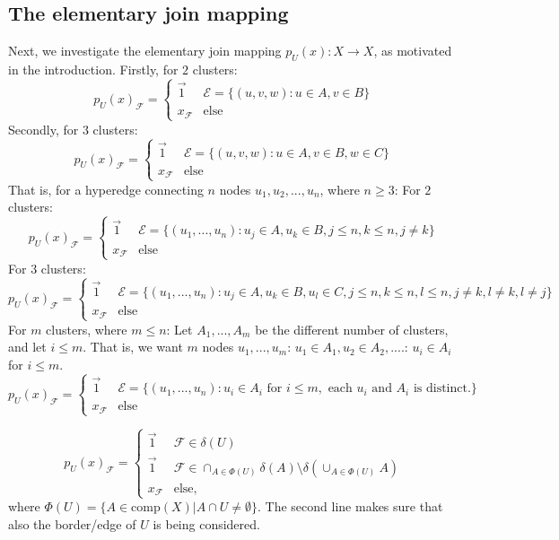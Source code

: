\subsection{The elementary join mapping}
Next, we investigate the elementary join mapping $p_U(x): X \to X$, as motivated in the introduction. Firstly, for $2$ clusters: \[ p_U(x)_{\mathcal{F}}=\begin{cases}
\vec{1} & \mathcal{E}=\{ (u,v,w): u \in A, v \in B\} \\
x_{\mathcal{F}} &  \text{else} 
\end{cases} \] 
Secondly, for $3$ clusters: \[ p_U(x)_{\mathcal{F}}=\begin{cases}
\vec{1} & \mathcal{E}=\{ (u,v,w): u \in A, v \in B, w \in C\} \\
x_{\mathcal{F}}  &  \text{else} 
\end{cases} \] 
That is, for a hyperedge connecting $n$ nodes $u_1,u_2, ..., u_n$, where $n \geq 3$: For $2$ clusters: 
\[ p_U(x)_{\mathcal{F}}=\begin{cases} \vec{1} & \mathcal{E}=\{ (u_1,..., u_n): u_j \in A, u_k \in B, j \leq n, k \leq n, j \neq k \} \\
x_{\mathcal{F}} &  \text{else} 
\end{cases} \] For $3$ clusters: 
\[ p_U(x)_{\mathcal{F}}=\begin{cases}
\vec{1} & \mathcal{E}=\{ (u_1,..., u_n): u_j \in A, u_k \in B, u_l \in C, j \leq n, k \leq n, l \leq n, j \neq k, l \neq k, l \neq j \} \\
x_{\mathcal{F}} & \text{else} 
\end{cases} \] 
For $m$ clusters, where $m \leq n$: Let $A_1, ..., A_m$ be the different number of clusters, and let $i \leq m$. That is, we want $m$ nodes $u_1, ..., u_m$: $u_1 \in A_1, u_2 \in A_2, ....$: $u_i \in A_i$ for $i \leq m$.  
\[ p_U(x)_{\mathcal{F}}=\begin{cases}
\vec{1} & \mathcal{E}=\{ (u_1,..., u_n): u_i \in A_i \text{ for } i \leq m, \text{ each } u_i \text{ and } A_i \text{ is distinct.}  \} \\
x_{\mathcal{F}} & \text{else} 
\end{cases} \] 

\[ p_U(x)_{\mathcal{F}}=\begin{cases}
\vec{1} & \mathcal{F} \in \delta(U) \\
\vec{1} & \mathcal{F} \in \cap_{A \in \Phi(U)} \delta(A) \setminus \delta( \cup_{A \in \Phi(U)} A) \\ 
x_{\mathcal{F}} & \text{else}, 
\end{cases} \] 
where $\Phi(U) = \{A \in \text{comp}(X) | A \cap U \neq \emptyset \}$. The second line makes sure that also the border/edge of $U$ is being considered.


